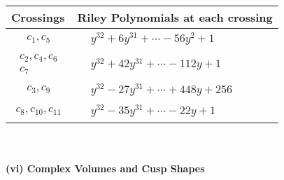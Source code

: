 \documentclass[1p]{elsarticle_modified}
\theoremstyle{definition}
\begin{document}
\begin{tabular}{m{50pt}|m{274pt}}
Crossings & \hspace{64pt}Riley Polynomials at each crossing \\
\hline $$\begin{aligned}c_{1},c_{5}\end{aligned}$$&$\begin{aligned}
&y^{32}+6 y^{31}+\cdots-56 y^2+1
\end{aligned}$\\
\hline $$\begin{aligned}c_{2},c_{4},c_{6}\\c_{7}\end{aligned}$$&$\begin{aligned}
&y^{32}+42 y^{31}+\cdots-112 y+1
\end{aligned}$\\
\hline $$\begin{aligned}c_{3},c_{9}\end{aligned}$$&$\begin{aligned}
&y^{32}-27 y^{31}+\cdots+448 y+256
\end{aligned}$\\
\hline $$\begin{aligned}c_{8},c_{10},c_{11}\end{aligned}$$&$\begin{aligned}
&y^{32}-35 y^{31}+\cdots-22 y+1
\end{aligned}$\\
\hline
\end{tabular}\\~\\
\newpage\flushleft \textbf{(vi) Complex Volumes and Cusp Shapes}
\end{document}

